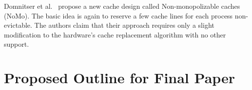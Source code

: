 \documentclass[onecolumn]{IEEEtran}
\begin{document}
Domnitser et al.~\cite{domnitser2012non} propose a new cache design called Non-monopolizable caches (NoMo).  The basic idea is again to reserve a few cache lines for each process non-evictable.  The authors claim that their approach requires only a slight modification to the hardware's cache replacement algorithm with no other support.

\section{Proposed Outline for Final Paper}



\end{document}
